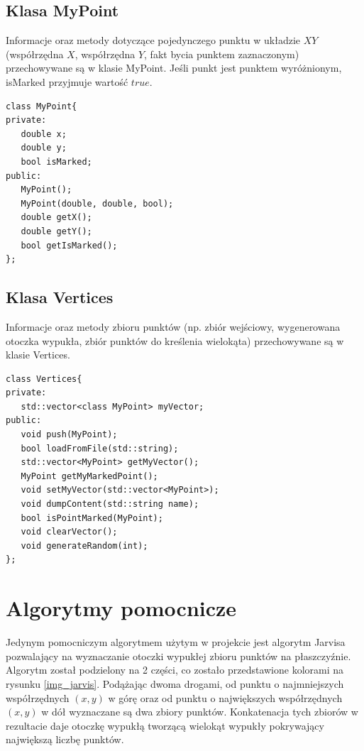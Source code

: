 \documentclass[11pt,a4paper]{article}
\begin{document}
\subsection{Klasa MyPoint}
Informacje oraz metody dotyczące pojedynczego punktu w układzie $XY$ (współrzędna $X$, współrzędna $Y$, fakt bycia punktem zaznaczonym) przechowywane są w klasie MyPoint. Jeśli punkt jest punktem wyróżnionym, isMarked przyjmuje wartość $true$.
\begin{verbatim}
class MyPoint{
private:
   double x;
   double y;
   bool isMarked;
public:
   MyPoint();
   MyPoint(double, double, bool);
   double getX();
   double getY();
   bool getIsMarked();
};
\end{verbatim}

\subsection{Klasa Vertices}
Informacje oraz metody zbioru punktów (np. zbiór wejściowy, wygenerowana otoczka wypukła, zbiór punktów do kreślenia wielokąta) przechowywane są w klasie Vertices.
\begin{verbatim}
class Vertices{
private:
   std::vector<class MyPoint> myVector;
public:
   void push(MyPoint);
   bool loadFromFile(std::string);
   std::vector<MyPoint> getMyVector();
   MyPoint getMyMarkedPoint();
   void setMyVector(std::vector<MyPoint>);
   void dumpContent(std::string name);
   bool isPointMarked(MyPoint);
   void clearVector();
   void generateRandom(int);
};
\end{verbatim}

\section{Algorytmy pomocnicze}
Jedynym pomocniczym algorytmem użytym w projekcie jest algorytm Jarvisa pozwalający na wyznaczanie otoczki wypukłej zbioru punktów na płaszczyźnie. Algorytm został podzielony na 2 części, co zostało przedstawione kolorami na rysunku \ref{img_jarvis}. Podążając dwoma drogami, od punktu o najmniejszych współrzędnych $(x,y)$ w górę oraz od punktu o największych współrzędnych $(x,y)$ w dół wyznaczane są dwa zbiory punktów. Konkatenacja tych zbiorów w rezultacie daje otoczkę wypukłą tworzącą wielokąt wypukły pokrywający największą liczbę punktów.
\end{document}
